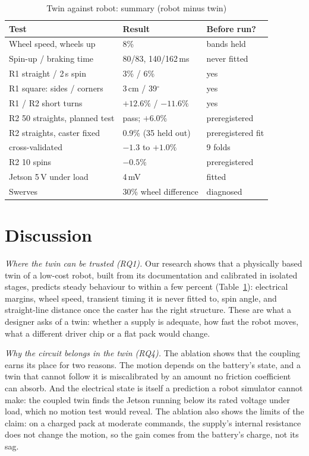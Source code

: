 \documentclass[conference,a4paper]{IEEEtran}
\begin{document}
\begin{table}[t]
\caption{Twin against robot: summary (robot minus twin)}
\label{tab:summary}
\centering\footnotesize
\setlength{\tabcolsep}{3pt}
\begin{tabular}{@{}p{3.4cm}p{2.4cm}l@{}}
\toprule
Test & Result & Before run? \\
\midrule
Wheel speed, wheels up & 8\% & bands held \\
Spin-up / braking time & 80/83, 140/162\,ms & never fitted \\
R1 straight / 2\,s spin & 3\% / 6\% & yes \\
R1 square: sides / corners & 3\,cm / 39$^\circ$ & yes \\
R1 / R2 short turns & $+12.6\%$ / $-11.6\%$ & yes \\
R2 50 straights, planned test & pass; $+6.0\%$ & preregistered \\
R2 straights, caster fixed & 0.9\% (35 held out) & preregistered fit \\
\quad cross-validated & $-1.3$ to $+1.0\%$ & 9 folds \\
R2 10 spins & $-0.5\%$ & preregistered \\
Jetson 5\,V under load & 4\,mV & fitted \\
Swerves & 30\% wheel difference & diagnosed \\
\bottomrule
\end{tabular}
\end{table}

\section{Discussion}\label{sec:discussion}

\emph{Where the twin can be trusted (RQ1).} Our research shows that a
physically based twin of a low-cost robot, built from its documentation and
calibrated in isolated stages, predicts steady behaviour to within a few
percent (Table~\ref{tab:summary}): electrical margins, wheel speed, transient
timing it is never fitted to, spin angle, and straight-line distance once the
caster has the right structure. These are what a designer asks of a twin:
whether a supply is adequate, how fast the robot moves, what a different
driver chip or a flat pack would change.

\emph{Why the circuit belongs in the twin (RQ4).} The ablation shows that the
coupling earns its place for two reasons. The motion depends on the
battery's state, and a twin that cannot follow it is miscalibrated by an
amount no friction coefficient can absorb. And the electrical state is itself
a prediction a robot simulator cannot make: the coupled twin finds the Jetson
running below its rated voltage under load, which no motion test would
reveal. The ablation also shows the limits of the claim: on a charged pack at
moderate commands, the supply's internal resistance does not change the
motion, so the gain comes from the battery's charge, not its sag.
\end{document}
